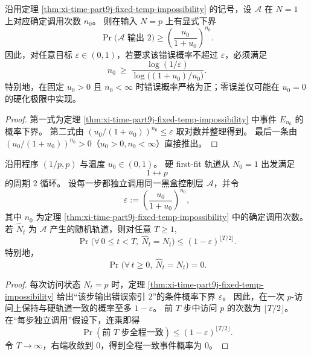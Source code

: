 \begin{proposition}\label{prop:xi-time-part9j-log-budget-lower-bound}
沿用定理 \ref{thm:xi-time-part9j-fixed-temp-impossibility} 的记号，设 \(\mathcal A\) 在 \(N=1\) 上对应确定调用次数 \(n_0\)。
则在输入 \(N=p\) 上有显式下界
\[
\Pr\bigl(\mathcal A\text{ 输出 }2\bigr)
\ge
\left(\frac{u_0}{1+u_0}\right)^{n_0}.
\]
因此，对任意目标 \(\varepsilon\in(0,1)\)，若要求该错误概率不超过 \(\varepsilon\)，必须满足
\[
n_0\ \ge\ \frac{\log(1/\varepsilon)}{\log\!\bigl((1+u_0)/u_0\bigr)}.
\]
特别地，在固定 \(u_0>0\) 且 \(n_0<\infty\) 时错误概率严格为正；零误差仅可能在 \(u_0=0\) 的硬化极限中实现。
\end{proposition}
\begin{proof}
第一式为定理 \ref{thm:xi-time-part9j-fixed-temp-impossibility} 中事件 \(E_{n_0}\) 的概率下界。
第二式由
\(
(u_0/(1+u_0))^{n_0}\le \varepsilon
\)
取对数并整理得到。
最后一条由 \((u_0/(1+u_0))^{n_0}>0\)（\(u_0>0,n_0<\infty\)）直接推出。
\end{proof}

\begin{theorem}[二指令分支循环的长期正确率指数塌缩]\label{thm:xi-time-part9j-two-cycle-exponential-collapse}
沿用程序 \((1/p,p)\) 与温度 \(u_0\in(0,1)\)。
硬 first-fit 轨道从 \(N_0=1\) 出发满足
\[
1\longleftrightarrow p
\]
的周期 \(2\) 循环。
设每一步都独立调用同一黑盒控制层 \(\mathcal A\)，并令
\[
\varepsilon:=\left(\frac{u_0}{1+u_0}\right)^{n_0},
\]
其中 \(n_0\) 为定理 \ref{thm:xi-time-part9j-fixed-temp-impossibility} 中的确定调用次数。
若 \(\widehat N_t\) 为 \(\mathcal A\) 产生的随机轨道，则对任意 \(T\ge 1\),
\[
\Pr\!\bigl(\forall\,0\le t<T,\ \widehat N_t=N_t\bigr)
\le
(1-\varepsilon)^{\lfloor T/2\rfloor}.
\]
特别地，
\[
\Pr\!\bigl(\forall\,t\ge 0,\ \widehat N_t=N_t\bigr)=0.
\]
\end{theorem}
\begin{proof}
每次访问状态 \(N_t=p\) 时，定理 \ref{thm:xi-time-part9j-fixed-temp-impossibility} 给出“该步输出错误索引 \(2\)”的条件概率下界 \(\varepsilon\)。
因此，在一次 \(p\)-访问上保持与硬轨道一致的概率至多 \(1-\varepsilon\)。
前 \(T\) 步中访问 \(p\) 的次数为 \(\lfloor T/2\rfloor\)。
在“每步独立调用”假设下，连乘即得
\[
\Pr(\text{前 }T\text{ 步全程一致})
\le
(1-\varepsilon)^{\lfloor T/2\rfloor}.
\]
令 \(T\to\infty\)，右端收敛到 \(0\)，得到全程一致事件概率为 \(0\)。
\end{proof}


